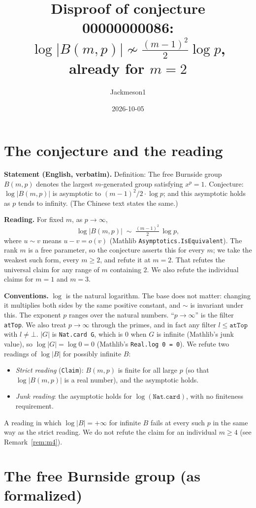 \documentclass[11pt]{article}
\title{Disproof of conjecture 00000000086:\\ $\log|B(m,p)|\not\sim\frac{(m-1)^2}{2}\log p$, already for $m=2$}
\author{Jackmeson1}
\date{2026-10-05}
\theoremstyle{definition}
\theoremstyle{remark}
\begin{document}
\maketitle

\section{The conjecture and the reading}

\textbf{Statement (English, verbatim).} Definition: The free Burnside group $B(m,p)$ denotes the
largest $m$-generated group satisfying $x^p = 1$. Conjecture: $\log|B(m,p)|$ is asymptotic to
$(m-1)^2/2\cdot\log p$; and this asymptotic holds as $p$ tends to infinity. (The Chinese text
states the same.)

\textbf{Reading.} For fixed $m$, as $p\to\infty$,
\[
  \log|B(m,p)| \;\sim\; \tfrac{(m-1)^2}{2}\,\log p ,
\]
where $u\sim v$ means $u-v=o(v)$ (Mathlib \texttt{Asymptotics.IsEquivalent}). The rank $m$ is a
free parameter, so the conjecture asserts this for every $m$; we take the weakest such form, every
$m\ge 2$, and refute it at $m=2$. That refutes the universal claim for any range of $m$ containing
$2$. We also refute the individual claims for $m=1$ and $m=3$.

\textbf{Conventions.} $\log$ is the natural logarithm. The base does not matter: changing it
multiplies both sides by the same positive constant, and $\sim$ is invariant under this. The
exponent $p$ ranges over the natural numbers. ``$p\to\infty$'' is the filter \texttt{atTop}. We
also treat $p\to\infty$ through the primes, and in fact any filter $l\le\texttt{atTop}$ with
$l\ne\bot$. $|G|$ is \texttt{Nat.card G}, which is $0$ when $G$ is infinite (Mathlib's junk value),
so $\log|G|=\log 0=0$ (Mathlib's \texttt{Real.log 0 = 0}). We refute two readings of $\log|B|$ for
possibly infinite $B$:
\begin{itemize}
\item \emph{Strict reading} (\texttt{Claim}): $B(m,p)$ is finite for all large $p$ (so that
  $\log|B(m,p)|$ is a real number), and the asymptotic holds.
\item \emph{Junk reading}: the asymptotic holds for $\log(\texttt{Nat.card})$, with no finiteness
  requirement.
\end{itemize}
A reading in which $\log|B|=+\infty$ for infinite $B$ fails at every such $p$ in the same way as the
strict reading. We do not refute the claim for an individual $m\ge 4$ (see Remark~\ref{rem:m4}).

\section{The free Burnside group (as formalized)}
\end{document}
